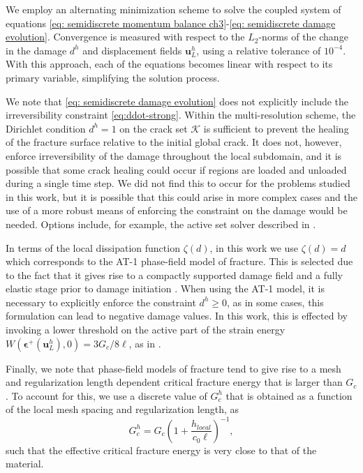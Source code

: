 We employ an alternating minimization scheme to solve the coupled system of equations \eqref{eq: semidiscrete momentum balance ch3}-\eqref{eq: semidiscrete damage evolution}. Convergence is measured with respect to the $L_2$-norms of the change in the damage $d^h$ and  displacement fields $\textbf{u}_L^h$, using a relative tolerance of $10^{-4}$. With this approach, each of the equations becomes linear with respect to its primary variable, simplifying the solution process.

We note that \eqref{eq: semidiscrete damage evolution} does not explicitly include the irreversibility constraint  \eqref{eq:ddot-strong}. Within the multi-resolution scheme, the Dirichlet condition $d^h=1$ on the crack set $\mathcal{K}$ is sufficient to prevent the healing of the fracture surface relative to the initial global crack.  It does not, however, enforce irreversibility of the damage throughout the local subdomain, and it is possible that some crack healing could occur if regions are loaded and unloaded during a single time step.  
We did not find this to occur for the problems studied in this work, but it is possible that this could arise in more complex cases and the use of a more robust means of enforcing the constraint on the damage would be needed.  Options include, for example, the active set solver described in \cite{hu2020frictionless}.   

In terms of the local dissipation function $\zeta(d)$, in this work we use $\zeta(d) = d$ which corresponds to the AT-1 phase-field model of fracture.  This is selected due to the fact that it gives rise to a compactly supported damage field and a fully elastic stage prior to damage initiation \cite{pham2011gradient}.
When using the AT-1 model, it is necessary to explicitly enforce the constraint $d^h \ge 0$, as in some cases, this formulation can lead to negative damage values. In this work, this is effected  by invoking a lower threshold on the active part of the strain energy $W(\boldsymbol{\epsilon^+}(\textbf{u}_L^h),0) = 3G_c/8\ell$, as in \cite{miehe2016phase}. 

Finally, we note that phase-field models of fracture tend to give rise to a mesh and regularization length dependent critical fracture energy that is larger than $G_c$ \cite{bourdin2008variational}.  To account for this, we use a discrete value of $G_c^h$ that is obtained as a function of the local mesh spacing and regularization length, as
    \begin{equation}
        G_c^h = G_c \left( 1 + \dfrac{ h_{local} }{c_0\ell} \right)^{-1},
    \end{equation}
such that the effective critical fracture energy is very close to that of the material.  

